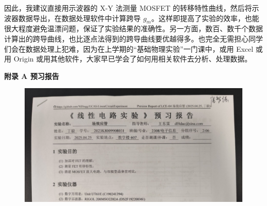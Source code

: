 \documentclass[UTF8]{article}
\begin{document}
因此，我建议直接用示波器的 X-Y 法测量 MOSFET 的转移特性曲线，然后将示波器数据导出，在数据处理软件中计算跨导 $g_m$。这样即提高了实验的效率，也能很大程度避免温漂问题，保证了实验结果的准确性。另一方面，数百、数千个数据计算出的跨导曲线，也比逐点法得到的跨导曲线要优越得多。也完全无需担心同学们会在数据处理上犯难，因为在上学期的“基础物理实验”一门课中，或用 Excel 或用 Origin 或用其他软件，大家早已学会了如何用相关软件去分析、处理数据。





















































\newpage
\newpage
\vspace*{\fill}\begin{center}\Huge{\bfseries 
    附录 A\hspace*{20pt} 预习报告
}\end{center} 
\begin{figure}[H]\centering
    \includegraphics[width=\columnwidth]{LCE-04-场效应管/assets/appendix/预习报告.png}
\end{figure}
\vspace*{\fill}
\thispagestyle{fancy} 

\end{document}
